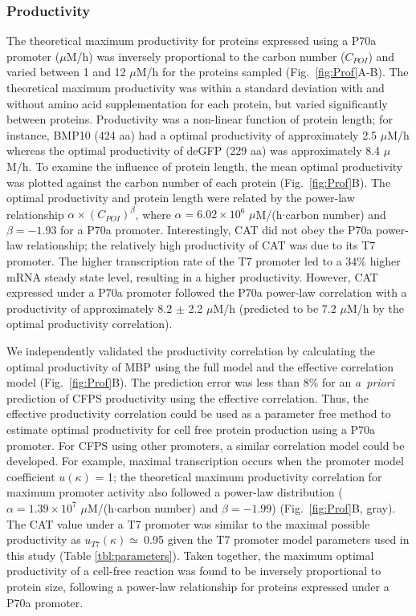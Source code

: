 \documentclass[journal=asbcd6,manuscript=article]{achemso}
\begin{document}
\subsubsection{Productivity}
The theoretical maximum productivity for proteins expressed using a P70a promoter ($\mu$M/h) was inversely proportional to the carbon number ($C_{POI}$) and varied between 1 and 12 $\mu$M/h for the proteins sampled (Fig.~\ref{fig:Prof}A-B).
The theoretical maximum productivity was within a standard deviation with and without amino acid supplementation for each protein, but varied significantly between proteins.
Productivity was a non-linear function of protein length; for instance, BMP10 (424 aa) had a optimal productivity of approximately 2.5 $\mu$M/h whereas the optimal productivity of deGFP (229 aa) was approximately 8.4 $\mu$M/h.
To examine the influence of protein length, the mean optimal productivity was plotted against the carbon number of each protein (Fig.~\ref{fig:Prof}B).
The optimal productivity and protein length were related by the power-law relationship $\alpha\times(C_{POI})^{\beta}$, where $\alpha = 6.02\times 10^{6}$ $\mu$M/(h$\cdot$carbon number) and $\beta=-1.93$ for a P70a promoter.
Interestingly, CAT did not obey the P70a power-law relationship; the relatively high productivity of CAT was due to its T7 promoter.
The higher transcription rate of the T7 promoter led to a 34\% higher mRNA steady state level, resulting in a higher productivity.
However, CAT expressed under a P70a promoter followed the P70a power-law correlation with a productivity of approximately 8.2 $\pm$ 2.2 $\mu$M/h (predicted to be 7.2 $\mu$M/h by the optimal productivity correlation).

We independently validated the productivity correlation by calculating the optimal productivity of MBP using the full model and the effective correlation model (Fig.~\ref{fig:Prof}B).
The prediction error was less than 8\% for an \emph{a~priori} prediction of CFPS productivity using the effective correlation.
Thus, the effective productivity correlation could be used as a parameter free method to estimate optimal productivity for cell free protein production using a P70a promoter.
For CFPS using other promoters, a similar correlation model could be developed.
For example, maximal transcription occurs when the promoter model coefficient $u\left(\kappa\right)$ = 1;
the theoretical maximum productivity correlation for maximum promoter activity also followed a power-law distribution ($\alpha = 1.39\times 10^{7}$ $\mu$M/(h$\cdot$carbon number) and $\beta=-1.99$) (Fig.~\ref{fig:Prof}B, gray).
The CAT value under a T7 promoter was similar to the maximal possible productivity as $u_{T7}\left(\kappa\right)\simeq~$0.95 given the T7 promoter model parameters used in this study (Table \ref{tbl:parameters}).
Taken together, the maximum optimal productivity of a cell-free reaction was found to be inversely proportional to protein size,
following a power-law relationship for proteins expressed under a P70a promoter.
\end{document}
